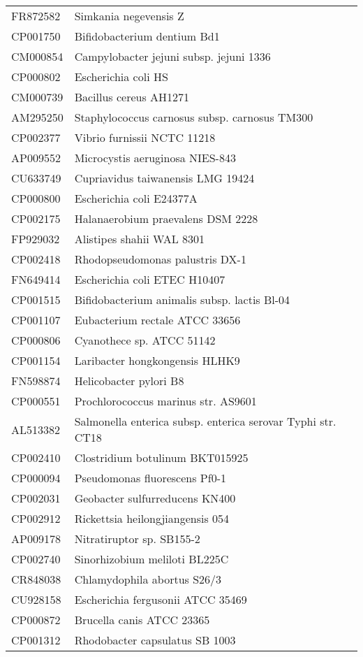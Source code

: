 \begin{longtable}{ll}
FR872582 & Simkania negevensis Z\\
CP001750 & Bifidobacterium dentium Bd1\\
CM000854 & Campylobacter jejuni subsp. jejuni 1336\\
CP000802 & Escherichia coli HS\\
CM000739 & Bacillus cereus AH1271\\
AM295250 & Staphylococcus carnosus subsp. carnosus TM300\\
CP002377 & Vibrio furnissii NCTC 11218\\
AP009552 & Microcystis aeruginosa NIES-843\\
CU633749 & Cupriavidus taiwanensis LMG 19424\\
CP000800 & Escherichia coli E24377A\\
CP002175 & Halanaerobium praevalens DSM 2228\\
FP929032 & Alistipes shahii WAL 8301\\
CP002418 & Rhodopseudomonas palustris DX-1\\
FN649414 & Escherichia coli ETEC H10407\\
CP001515 & Bifidobacterium animalis subsp. lactis Bl-04\\
CP001107 & Eubacterium rectale ATCC 33656\\
CP000806 & Cyanothece sp. ATCC 51142\\
CP001154 & Laribacter hongkongensis HLHK9\\
FN598874 & Helicobacter pylori B8\\
CP000551 & Prochlorococcus marinus str. AS9601\\
AL513382 & Salmonella enterica subsp. enterica serovar Typhi str. CT18\\
CP002410 & Clostridium botulinum BKT015925\\
CP000094 & Pseudomonas fluorescens Pf0-1\\
CP002031 & Geobacter sulfurreducens KN400\\
CP002912 & Rickettsia heilongjiangensis 054\\
AP009178 & Nitratiruptor sp. SB155-2\\
CP002740 & Sinorhizobium meliloti BL225C\\
CR848038 & Chlamydophila abortus S26/3\\
CU928158 & Escherichia fergusonii ATCC 35469\\
CP000872 & Brucella canis ATCC 23365\\
CP001312 & Rhodobacter capsulatus SB 1003\\

\end{longtable}

